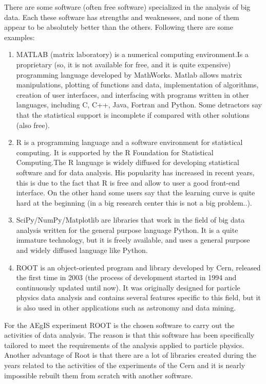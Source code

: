 There are some software (often free software) specialized in the analysis of big data. Each these software has strengths and weaknesses, and none of them appear to be absolutely better than the others. Following there are some examples:
 
\begin{enumerate}

\item MATLAB (matrix laboratory) is a numerical computing environment.Is a proprietary (so, it is not available for free, and it is quite expensive) programming language developed by MathWorks. Matlab allows matrix manipulations, plotting of functions and data, implementation of algorithms, creation of user interfaces, and interfacing with programs written in other languages, including C, C++, Java, Fortran and Python. 
Some detractors say that the statistical support is incomplete if compared with other solutions (also free).

\item R is a programming language and a software environment for statistical computing. It is supported by the R Foundation for Statistical Computing.The R language is widely diffused for developing statistical software and for data analysis. His popularity has increased in recent years, this is due to the fact that R is free and allow to user a good front-end interface. On the other hand some users say that the learning curve is quite hard at the beginning (in a big research center this is not a big problem..).  

\item SciPy/NumPy/Matplotlib are libraries that work in the field of big data analysis written for the general purpose language Python. It is a quite immature technology, but it is freely available, and uses a general purpose and widely diffused language like Python.

\item ROOT is an object-oriented program and library developed by Cern, released the first time in 2003 (the process of development started in 1994 and continuously updated until now). It was originally designed for particle physics data analysis and contains several features specific to this field, but it is also used in other applications such as astronomy and data mining. 

\end{enumerate}

For the AEgIS experiment ROOT is the chosen software to carry out the activities of data analysis. The reason is that this software has been specifically tailored to meet the requirements of the analysis applied to particle physics.
Another advantage of Root is that there are a lot of libraries created during the years related to the activities of the experiments of the Cern and it is nearly impossible rebuilt them from scratch with another software.

